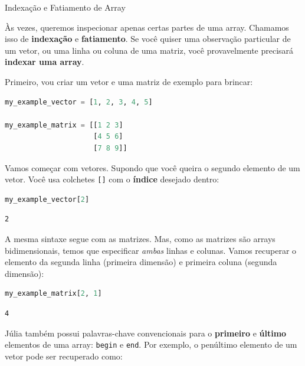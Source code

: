\documentclass[
  notoc %
]{tufte-book}
\makeatletter
\newcommand{\passthrough}[1]{#1}
\renewcommand\subsubsection{%
\@startsection{subsubsection}{3}{\z@ }{-3.25ex\@plus -1ex \@minus -.2ex}{1.5ex \@plus .2ex}{\normalfont \normalsize \bfseries }
}
\makeatother
\begin{document}
\hypertarget{sec:array_indexing}{%
\subsubsection{Indexação e Fatiamento de
Array}\label{sec:array_indexing}}

Às vezes, queremos inspecionar apenas certas partes de uma array.
Chamamos isso de \textbf{indexação} e \textbf{fatiamento}. Se você
quiser uma observação particular de um vetor, ou uma linha ou coluna de
uma matriz, você provavelmente precisará \textbf{indexar uma array}.

Primeiro, vou criar um vetor e uma matriz de exemplo para brincar:

\begin{lstlisting}[language=Julia]
my_example_vector = [1, 2, 3, 4, 5]

my_example_matrix = [[1 2 3]
                     [4 5 6]
                     [7 8 9]]
\end{lstlisting}

Vamos começar com vetores. Supondo que você queira o segundo elemento de
um vetor. Você usa colchetes \passthrough{\lstinline![]!} com o
\textbf{índice} desejado dentro:

\begin{lstlisting}[language=Julia]
my_example_vector[2]
\end{lstlisting}

\begin{lstlisting}[language=Output]
2
\end{lstlisting}

A mesma sintaxe segue com as matrizes. Mas, como as matrizes são arrays
bidimensionais, temos que especificar \emph{ambas} linhas e colunas.
Vamos recuperar o elemento da segunda linha (primeira dimensão) e
primeira coluna (segunda dimensão):

\begin{lstlisting}[language=Julia]
my_example_matrix[2, 1]
\end{lstlisting}

\begin{lstlisting}[language=Output]
4
\end{lstlisting}

Júlia também possui palavras-chave convencionais para o
\textbf{primeiro} e \textbf{último} elementos de uma array:
\passthrough{\lstinline!begin!} e \passthrough{\lstinline!end!}. Por
exemplo, o penúltimo elemento de um vetor pode ser recuperado como:
\end{document}
